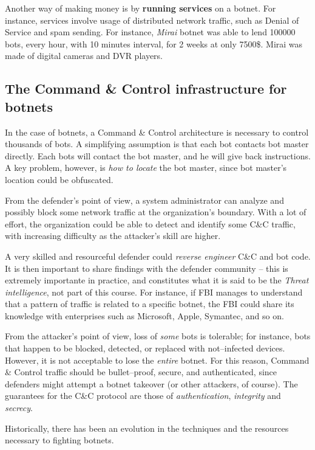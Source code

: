 \documentclass[10pt]{extreport}
\begin{document}
Another way of making money is by \textbf{running services} on a botnet. For
instance, services involve usage of distributed network traffic, such as Denial
of Service and spam sending. For instance, \emph{Mirai} botnet was able to lend
100000 bots, every hour, with 10 minutes interval, for 2 weeks at only 7500\$.
Mirai was made of digital cameras and DVR players.

\subsection{The Command \& Control infrastructure for botnets}

In the case of botnets, a Command \& Control architecture is necessary to
control thousands of bots. A simplifying assumption is that each bot contacts
bot master directly. Each bots will contact the bot master, and he will give
back instructions. A key problem, however, is \emph{how to locate} the bot
master, since bot master's location could be obfuscated.

From the defender's point of view, a system administrator can analyze and
possibly block some network traffic at the organization's boundary. With a lot
of effort, the organization could be able to detect and identify some C\&C
traffic, with increasing difficulty as the attacker's skill are higher.

A very skilled and resourceful defender could \emph{reverse engineer} C\&C and
bot code. It is then important to share findings with the defender community --
this is extremely importante in practice, and constitutes what it is said to be
the \emph{Threat intelligence}, not part of this course. For instance, if FBI
manages to understand that a pattern of traffic is related to a specific
botnet, the FBI could share its knowledge with enterprises such as Microsoft,
Apple, Symantec, and so on.

From the attacker's point of view, loss of \emph{some} bots is tolerable; for
instance, bots that happen to be blocked, detected, or replaced with
not--infected devices. However, it is not acceptable to lose the \emph{entire}
botnet. For this reason, Command \& Control traffic should be bullet--proof,
secure, and authenticated, since defenders might attempt a botnet takeover (or
other attackers, of course). The guarantees for the C\&C protocol are those of
\emph{authentication}, \emph{integrity} and \emph{secrecy}.

Historically, there has been an evolution in the techniques and the resources
necessary to fighting botnets.
\end{document}
